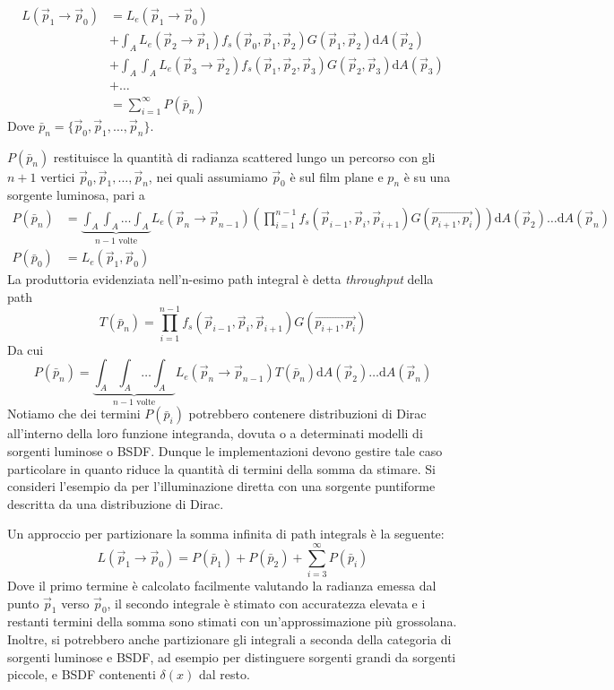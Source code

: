 \begin{align}
	L(\vec{p}_1\to\vec{p}_0)&=L_e(\vec{p}_1\to\vec{p}_0) \nonumber \\
		&+\int_{A}L_e(\vec{p}_2\to\vec{p}_1)f_s(\vec{p}_0,\vec{p}_1,\vec{p}_2)G(\vec{p}_1,\vec{p}_2)\mathrm{d}A(\vec{p}_2) \nonumber \\
		&+\int_{A}\int_{A}L_e(\vec{p}_3\to\vec{p}_2)f_s(\vec{p}_1,\vec{p}_2,\vec{p}_3)G(\vec{p}_2,\vec{p}_3)\mathrm{d}A(\vec{p}_3) \nonumber \\
		&+\ldots \nonumber \\
		&=\sum_{i=1}^\infty P(\bar{p}_n)
\end{align}
Dove $\bar{p}_n=\{\vec{p}_0,\vec{p}_1,\ldots,\vec{p}_n\}$.\par
$P(\bar{p}_n)$ restituisce la quantit\`a di radianza scattered lungo un percorso con 
gli $n+1$ vertici $\vec{p}_0,\vec{p}_1,\ldots,\vec{p}_n$, nei quali assumiamo $\vec{p}_0$ \`e sul film plane e $p_n$ \`e su una sorgente luminosa, 
pari a 
\begin{align}
	P(\bar{p}_n) &= \underbrace{\int_A\int_A\ldots\int_A}_{n-1\text{ volte}}L_e(\vec{p}_n\to\vec{p}_{n-1})\left(\prod_{i=1}^{n-1}%
		f_s(\vec{p}_{i-1},\vec{p}_i,\vec{p}_{i+1})G(\vec{p_{i+1},p_{i}})\right)\mathrm{d}A(\vec{p}_2)\ldots\mathrm{d}A(\vec{p}_n) \\
	P(\bar{p}_0) &= L_e(\vec{p}_1,\vec{p}_0) \nonumber
\end{align}
La produttoria evidenziata nell'n-esimo path integral \`e detta \textit{throughput} della path
\begin{equation}
	T(\bar{p}_n)=\prod_{i=1}^{n-1}f_s(\vec{p}_{i-1},\vec{p}_i,\vec{p}_{i+1})G(\vec{p_{i+1},p_{i}})
\end{equation}
Da cui 
\begin{equation}
	P(\bar{p}_n) = \underbrace{\int_A\int_A\ldots\int_A}_{n-1\text{ volte}}L_e(\vec{p}_n\to\vec{p}_{n-1})T(\bar{p}_n)%
		\mathrm{d}A(\vec{p}_2)\ldots\mathrm{d}A(\vec{p}_n)
\end{equation}
Notiamo che dei termini $P(\bar{p}_i)$ potrebbero contenere distribuzioni di Dirac all'interno della loro funzione integranda, dovuta o a determinati 
modelli di sorgenti luminose o BSDF. Dunque le implementazioni devono gestire tale caso particolare in quanto riduce la quantit\`a di termini della 
somma da stimare. Si consideri l'esempio da \cite{pharr} per l'illuminazione diretta con una sorgente puntiforme descritta da una distribuzione di 
Dirac.\par
Un approccio per partizionare la somma infinita di path integrals \`e la seguente:
\begin{equation}
	L(\vec{p}_1\to\vec{p}_0)=P(\bar{p}_1)+P(\bar{p}_2)+\sum_{i=3}^\infty P(\bar{p}_i)
\end{equation}
Dove il primo termine \`e calcolato facilmente valutando la radianza emessa dal punto $\vec{p}_1$ verso $\vec{p}_0$, il secondo integrale \`e stimato 
con accuratezza elevata e i restanti termini della somma sono stimati con un'approssimazione pi\`u grossolana. Inoltre, si potrebbero anche partizionare
gli integrali a seconda della categoria di sorgenti luminose e BSDF, ad esempio per distinguere sorgenti grandi da sorgenti piccole, e BSDF contenenti
$\delta(x)$ dal resto.
